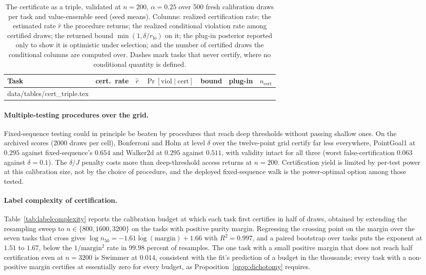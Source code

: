 \documentclass{article} %
\makeatletter
\newcommand{\tabinput}[1]{\@@input#1 }
\makeatother
\begin{document}
\begin{table}[h]
\caption{The certificate as a triple, validated at $n = 200$, $\alpha = 0.25$ over 500 fresh calibration draws per task and value-ensemble seed (seed means). Columns: realized certification rate; the estimated rate $\hat r$ the procedure returns; the realized conditional violation rate among certified draws; the returned bound $\min(1, \delta / r_{\mathrm{lo}})$ on it; the plug-in posterior reported only to show it is optimistic under selection; and the number of certified draws the conditional columns are computed over. Dashes mark tasks that never certify, where no conditional quantity is defined.}
\label{tab:certtriple}
\begin{center}
\small
\begin{tabular}{l rrrrrr}
\toprule
Task & cert.\ rate & $\hat r$ & $\Pr[\text{viol} \mid \text{cert}]$ & bound & plug-in & $n_{\text{cert}}$ \\
\midrule
\tabinput{data/tables/cert_triple.tex}
\bottomrule
\end{tabular}
\end{center}
\end{table}

\paragraph{Multiple-testing procedures over the grid.} Fixed-sequence testing could in principle be beaten by procedures that reach deep thresholds without passing shallow ones. On the archived scores (2000 draws per cell), Bonferroni and Holm at level $\delta$ over the twelve-point grid certify far less everywhere, PointGoal1 at $0.295$ against fixed-sequence's $0.654$ and Walker2d at $0.295$ against $0.511$, with validity intact for all three (worst false-certification $0.063$ against $\delta = 0.1$). The $\delta/J$ penalty costs more than deep-threshold access returns at $n = 200$. Certification yield is limited by per-test power at this calibration size, not by the choice of procedure, and the deployed fixed-sequence walk is the power-optimal option among those tested.

\paragraph{Label complexity of certification.} Table~\ref{tab:labelcomplexity} reports the calibration budget at which each task first certifies in half of draws, obtained by extending the resampling sweep to $n \in \{800, 1600, 3200\}$ on the tasks with positive purity margin. Regressing the crossing point on the margin over the seven tasks that cross gives $\log n_{50} = -1.61 \log(\text{margin}) + 1.66$ with $R^2 = 0.997$, and a paired bootstrap over tasks puts the exponent at $1.51$ to $1.67$, below the $1/\text{margin}^2$ rate in $99.98$ percent of resamples. The one task with a small positive margin that does not reach half certification even at $n = 3200$ is Swimmer at $0.014$, consistent with the fit's prediction of a budget in the thousands; every task with a non-positive margin certifies at essentially zero for every budget, as Proposition~\ref{prop:dichotomy} requires.
\end{document}
